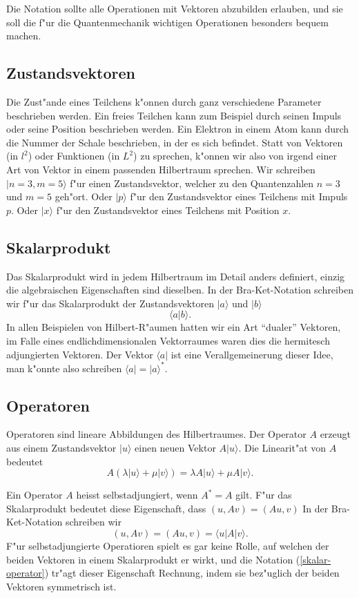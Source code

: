 Die Notation sollte alle Operationen mit Vektoren abzubilden erlauben,
und sie soll die f"ur die Quantenmechanik wichtigen Operationen besonders
bequem machen.

\subsection{Zustandsvektoren}
Die Zust"ande eines Teilchens k"onnen durch ganz verschiedene Parameter
beschrieben werden. Ein freies Teilchen kann zum Beispiel durch seinen
Impuls oder seine Position beschrieben werden. Ein Elektron in einem
Atom kann durch die Nummer der Schale beschrieben, in der es sich befindet. 
Statt von Vektoren (in $l^2$) oder Funktionen (in $L^2$) zu sprechen, k"onnen
wir also von irgend einer Art von Vektor in einem passenden Hilbertraum 
sprechen. Wir schreiben 
$|n=3,m=5\rangle$ f"ur einen Zustandsvektor, welcher zu den Quantenzahlen $n=3$ und $m=5$ geh"ort. Oder $|p\rangle$ f"ur den Zustandsvektor eines Teilchens
mit Impuls $p$. Oder $|x\rangle$ f"ur den Zustandsvektor eines Teilchens
mit Position $x$.

\subsection{Skalarprodukt}
Das Skalarprodukt wird in jedem Hilbertraum im Detail anders definiert,
einzig die algebraischen Eigenschaften sind dieselben. In der Bra-Ket-Notation
schreiben wir  f"ur das Skalarprodukt der Zustandsvektoren 
$|a\rangle$ und $|b\rangle$
\[
\langle a|b\rangle.
\]
In allen Beispielen von Hilbert-R"aumen hatten wir ein Art ``dualer''
Vektoren, im Falle eines endlichdimensionalen Vektorraumes waren dies
die hermitesch adjungierten Vektoren. Der Vektor $\langle a|$ ist eine
Verallgemeinerung dieser Idee, man k"onnte also schreiben
$\langle a|=|a\rangle^*$.

\subsection{Operatoren}
Operatoren sind lineare Abbildungen des Hilbertraumes. Der Operator $A$
erzeugt aus einem Zustandsvektor $|u\rangle$ einen neuen Vektor
$A|u\rangle$. Die Linearit"at von $A$ bedeutet
\[
A(\lambda |u\rangle + \mu |v\rangle)=\lambda A|u\rangle + \mu A|v\rangle.
\]

Ein Operator $A$ heisst selbstadjungiert, wenn $A^*=A$ gilt.
F"ur das Skalarprodukt bedeutet diese Eigenschaft, dass $(u, Av)=(Au,v)$ 
In der Bra-Ket-Notation schreiben wir 
\begin{equation}
(u,Av)=(Au,v)=\langle u|A|v\rangle.
\label{skalar-operator}
\end{equation}
F"ur selbstadjungierte Operatioren spielt es gar keine Rolle, auf welchen
der beiden Vektoren in einem Skalarprodukt er wirkt, und die Notation
(\ref{skalar-operator}) tr"agt dieser Eigenschaft Rechnung, indem sie
bez"uglich der beiden Vektoren symmetrisch ist.


